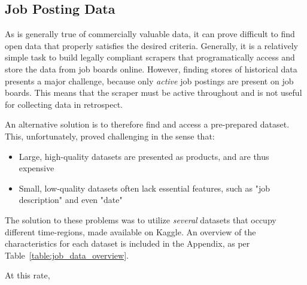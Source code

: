 \subsection{Job Posting Data}
As is generally true of commercially valuable data, it can prove difficult to find open data that properly satisfies the desired criteria. Generally, it is a relatively simple task to build legally compliant scrapers that programatically access and store the data from job boards online. However, finding stores of historical data presents a major challenge, because only \emph{active} job postings are present on job boards. This means that the scraper must be active throughout and is not useful for collecting data in retrospect.

An alternative solution is to therefore find and access a pre-prepared dataset. This, unfortunately, proved challenging in the sense that:
\begin{itemize}
  \item Large, high-quality datasets are presented as products, and are thus expensive
  \item Small, low-quality datasets often lack essential features, such as "job description" and even "date"
\end{itemize}

The solution to these problems was to utilize \emph{several} datasets that occupy different time-regions, made available on Kaggle. An overview of the characteristics for each dataset is included in the Appendix, as per Table~\ref{table:job_data_overview}.

At this rate,